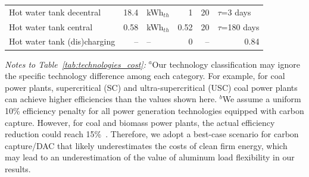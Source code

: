 \documentclass[preprint,12pt]{elsarticle}
\begin{document}
\begin{table}[htbp]
\begin{tabular}{lrlrrr}
    Hot water tank decentral                  & 18.4                                                                                        & kWh$_{th}$ & 1 & 20 & \multicolumn{1}{l}{$\tau$=3 days} \\
    Hot water tank central                    & 0.58                                                                                        & kWh$_{th}$ & 0.52 & 20 & \multicolumn{1}{l}{$\tau$=180 days} \\
    Hot water tank (dis)charging              & --                                                                                          & --        & 0    & -- & 0.84 \\ \hline
  \end{tabular}
\end{table}

\noindent\textit{Notes to Table~\ref{tab:technologies_cost}:} $^a$Our technology classification may ignore the specific technology difference among each category. For example, for coal power plants, supercritical (SC) and ultra-supercritical (USC) coal power plants can achieve higher efficiencies than the values shown here. $^b$We assume a uniform 10\% efficiency penalty for all power generation technologies equipped with carbon capture. However, for coal and biomass power plants, the actual efficiency reduction could reach 15\%~\citep{osti_1893822}. Therefore, we adopt a best-case scenario for carbon capture/DAC that likely underestimates the costs of clean firm energy, which may lead to an underestimation of the value of aluminum load flexibility in our results.
\end{document}
